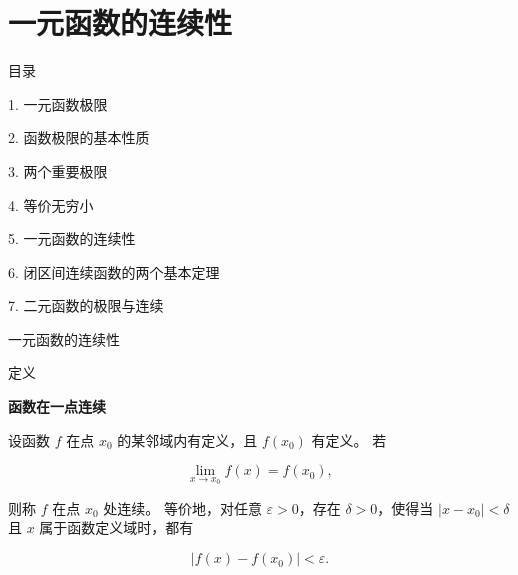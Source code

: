 \documentclass[aspectratio=169,10pt,fontset=fandol]{ctexbeamer}
\begin{document}
\section{一元函数的连续性}
\begin{frame}[t,fragile]{目录}
\normalsize
{\color{black}\normalsize 1. 一元函数极限\par}\vspace{0.22em}
{\color{black}\normalsize 2. 函数极限的基本性质\par}\vspace{0.22em}
{\color{black}\normalsize 3. 两个重要极限\par}\vspace{0.22em}
{\color{black}\normalsize 4. 等价无穷小\par}\vspace{0.22em}
{\color{blue}\normalsize 5. 一元函数的连续性\par}\vspace{0.22em}
{\color{gray!40}\normalsize 6. 闭区间连续函数的两个基本定理\par}\vspace{0.22em}
{\color{gray!40}\normalsize 7. 二元函数的极限与连续\par}\vspace{0.22em}
\end{frame}
\begin{frame}[t,fragile]{一元函数的连续性}
\normalsize
\begin{block}{定义}
{\normalsize
\textbf{函数在一点连续}\par


设函数 $f$ 在点 $x_0$ 的某邻域内有定义，且 $f(x_0)$ 有定义。 若

\[

\lim_{x\to x_0}f(x)=f(x_0),

\]

则称 $f$ 在点 $x_0$ 处连续。 等价地，对任意 $\varepsilon>0$，存在 $\delta>0$，使得当 $|x-x_0|<\delta$ 且 $x$ 属于函数定义域时，都有

\[

|f(x)-f(x_0)|<\varepsilon.

\]


}
\end{block}
\end{frame}
\end{document}
